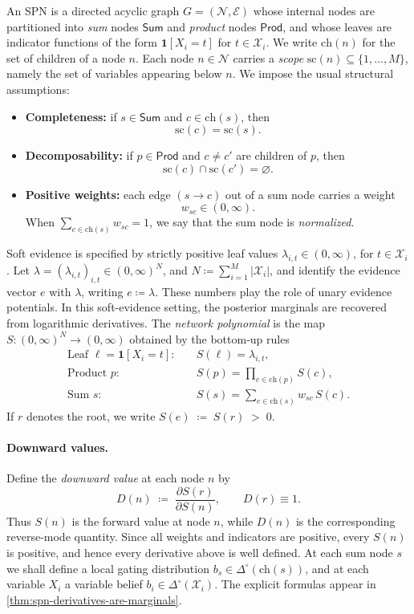 \documentclass[12pt]{article}
\newcommand{\1}{\mathbb{1}}
\newcommand{\defeq}{\coloneq}
\theoremstyle{definition}
\begin{document}
An SPN is a directed acyclic graph $G=(\mathcal N,\mathcal E)$ whose internal nodes are partitioned into \emph{sum} nodes $\mathsf{Sum}$ and \emph{product} nodes $\mathsf{Prod}$, and whose leaves are indicator functions of the form $\mathbf{1}[X_i=t]$ for $t\in\mathcal X_i$. We write $\mathrm{ch}(n)$ for the set of children of a node $n$.
Each node $n\in\mathcal N$ carries a \emph{scope} $\mathrm{sc}(n)\subseteq\{1,\ldots,M\}$, namely the set of variables appearing below $n$. We impose the usual structural assumptions:
\begin{itemize}[leftmargin=1.5em]
\item \textbf{Completeness:} if $s\in\mathsf{Sum}$ and $c\in\mathrm{ch}(s)$, then
\[
\mathrm{sc}(c)=\mathrm{sc}(s).
\]
\item \textbf{Decomposability:} if $p\in\mathsf{Prod}$ and $c\neq c'$ are children of $p$, then
\[
\mathrm{sc}(c)\cap \mathrm{sc}(c')=\varnothing.
\]
\item \textbf{Positive weights:} each edge $(s\to c)$ out of a sum node carries a weight
\[
w_{sc}\in(0,\infty).
\]
When $\sum_{c\in\mathrm{ch}(s)} w_{sc}=1$, we say that the sum node is \emph{normalized}.
\end{itemize}
Soft evidence is specified by strictly positive leaf values
$\lambda_{i,t}\in(0,\infty)$, for $t\in\mathcal X_i$. Let $\lambda = (\lambda_{i,t})_{i,t}\in(0,\infty)^N$, and $N\defeq\sum_{i=1}^M |\mathcal X_i|$, and identify the evidence vector $e$ with $\lambda$, writing
$e\coloneqq \lambda$. These numbers play the role of unary evidence potentials. In this soft-evidence setting, the posterior marginals are recovered from logarithmic derivatives. The \emph{network polynomial} is the map $S:(0,\infty)^N\to(0,\infty)$ obtained by the bottom-up rules
\begin{align*}
\text{Leaf } \ell=\mathbf{1}[X_i=t]:&\quad S(\ell)=\lambda_{i,t},\\[0.25em]
\text{Product } p:&\quad S(p)=\prod_{c\in\mathrm{ch}(p)} S(c),\\[0.25em]
\text{Sum } s:&\quad S(s)=\sum_{c\in\mathrm{ch}(s)} w_{sc}\,S(c).
\end{align*}
If $r$ denotes the root, we write $S(e)\;\defeq\;S(r)\;>\;0$.

\paragraph{Downward values.}
Define the \emph{downward value} at each node $n$ by
\[
D(n)\;\defeq\;\frac{\partial S(r)}{\partial S(n)},
\qquad
D(r)\equiv 1.
\]
Thus $S(n)$ is the forward value at node $n$, while $D(n)$ is the corresponding reverse-mode quantity. Since all weights and indicators are positive, every $S(n)$ is positive, and hence every derivative above is well defined.
At each sum node $s$ we shall define a local gating distribution $b_s\in\Delta^\circ(\mathrm{ch}(s))$, and at each variable $X_i$ a variable belief $b_i\in\Delta^\circ(\mathcal X_i)$. The explicit formulas appear in \cref{thm:spn-derivatives-are-marginals}.
\end{document}
